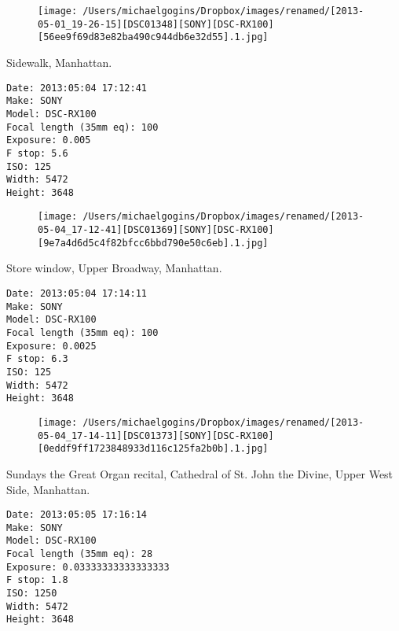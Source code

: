 \documentclass[11pt,letter,DIV=14,paper=landscape]{scrbook}
\begin{document}
\begin{figure}
\texttt{[image: /Users/michaelgogins/Dropbox/images/renamed/[2013-05-01\_19-26-15][DSC01348][SONY][DSC-RX100][56ee9f69d83e82ba490c944db6e32d55].1.jpg]}
\end{figure}
    
\clearpage
\noindent Sidewalk, Manhattan.
\noindent
\begin{lstlisting}
Date: 2013:05:04 17:12:41
Make: SONY
Model: DSC-RX100
Focal length (35mm eq): 100
Exposure: 0.005
F stop: 5.6
ISO: 125
Width: 5472
Height: 3648
\end{lstlisting}
\clearpage

\begin{figure}
\texttt{[image: /Users/michaelgogins/Dropbox/images/renamed/[2013-05-04\_17-12-41][DSC01369][SONY][DSC-RX100][9e7a4d6d5c4f82bfcc6bbd790e50c6eb].1.jpg]}
\end{figure}
    
\clearpage
\noindent Store window, Upper Broadway, Manhattan.
\noindent
\begin{lstlisting}
Date: 2013:05:04 17:14:11
Make: SONY
Model: DSC-RX100
Focal length (35mm eq): 100
Exposure: 0.0025
F stop: 6.3
ISO: 125
Width: 5472
Height: 3648
\end{lstlisting}
\clearpage

\begin{figure}
\texttt{[image: /Users/michaelgogins/Dropbox/images/renamed/[2013-05-04\_17-14-11][DSC01373][SONY][DSC-RX100][0eddf9ff1723848933d116c125fa2b0b].1.jpg]}
\end{figure}
    
\clearpage
\noindent Sundays the Great Organ recital, Cathedral of St. John the Divine, Upper West Side, Manhattan.
\noindent
\begin{lstlisting}
Date: 2013:05:05 17:16:14
Make: SONY
Model: DSC-RX100
Focal length (35mm eq): 28
Exposure: 0.03333333333333333
F stop: 1.8
ISO: 1250
Width: 5472
Height: 3648
\end{lstlisting}
\clearpage
\end{document}

